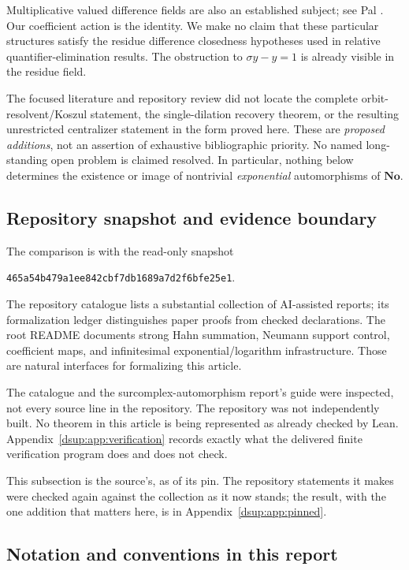 \documentclass[11pt,oneside]{article}
\numberwithin{equation}{section}
\theoremstyle{definition}
\theoremstyle{remark}
\newcommand{\No}{\mathbf{No}}
\newcommand{\pin}{\texttt{465a54b479a1ee842cbf7db1689a7d2f6bfe25e1}}
\begin{document}
Multiplicative valued difference fields are also an established subject;
see Pal \cite{Pal}. Our coefficient action is the identity. We make no
claim that these particular structures satisfy the residue difference
closedness hypotheses used in relative quantifier-elimination results.
The obstruction to $\sigma y-y=1$ is already visible in the residue field.

The focused literature and repository review did not locate the complete
orbit-resolvent/Koszul statement, the single-dilation recovery theorem,
or the resulting unrestricted centralizer statement in the form proved
here. These are \emph{proposed additions}, not an assertion of exhaustive
bibliographic priority. No named long-standing open problem is claimed
resolved. In particular, nothing below determines the existence or image
of nontrivial \emph{exponential} automorphisms of $\No$.

\subsection{Repository snapshot and evidence boundary}

The comparison is with the read-only snapshot
\begin{center}\small\pin.\end{center}
The repository catalogue \cite{RepoDocs} lists a substantial collection of
AI-assisted reports; its formalization ledger distinguishes paper proofs
from checked declarations. The root README \cite{Repo} documents strong
Hahn summation, Neumann support control, coefficient maps, and
infinitesimal exponential/logarithm infrastructure. Those are natural
interfaces for formalizing this article.

The catalogue and the surcomplex-automorphism report's guide were inspected,
not every source line in the repository. The repository was not independently
built. No theorem in this article is being represented as already checked
by Lean. Appendix~\ref{dsup:app:verification} records exactly what the delivered
finite verification program does and does not check.

This subsection is the source's, as of its pin. The repository statements
it makes were checked again against the collection as it now stands; the
result, with the one addition that matters here, is in
Appendix~\ref{dsup:app:pinned}.

\subsection{Notation and conventions in this report}\label{dsup:sec:conventions}
\end{document}
